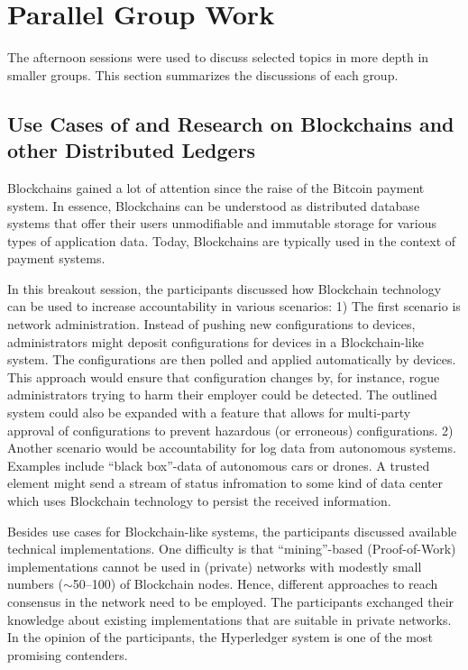 \section{Parallel Group Work}\label{sec:parallel-group-work}

The afternoon sessions were used to discuss selected topics in more depth in
smaller groups. This section summarizes the discussions of each group.


\subsection{Use Cases of and Research on Blockchains and other Distributed Ledgers}

Blockchains gained a lot of attention since the raise of the Bitcoin payment system. In essence, Blockchains can be understood as distributed database systems that offer their users unmodifiable and immutable storage for various types of application data. Today, Blockchains are typically used in the context of payment systems.

In this breakout session, the participants discussed how Blockchain technology can be used to increase accountability in various scenarios: 1) The first scenario is network administration. Instead of pushing new configurations to devices, administrators might deposit configurations for devices in a Blockchain-like system. The configurations are then polled and applied automatically by devices. This approach would ensure that configuration changes by, for instance, rogue administrators trying to harm their employer could be detected. The outlined system could also be expanded with a feature that allows for multi-party approval of configurations to prevent hazardous (or erroneous) configurations. 2) Another scenario would be accountability for log data from autonomous systems. Examples include ``black box''-data of autonomous cars or drones. A trusted element might send a stream of status infromation to some kind of data center which uses Blockchain technology to persist the received information.

Besides use cases for Blockchain-like systems, the participants discussed available technical implementations. One difficulty is that ``mining''-based (Proof-of-Work) implementations cannot be used in (private) networks with modestly small numbers ($\sim$50--100) of Blockchain nodes. Hence, different approaches to reach consensus in the network need to be employed. The participants exchanged their knowledge about existing implementations that are suitable in private networks. In the opinion of the participants, the Hyperledger system is one of the most promising contenders.

